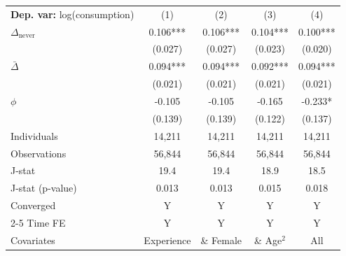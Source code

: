\begin{tabular}{l cccc} \toprule  \textbf{Dep. var:}  log(consumption) 
                    &\multicolumn{1}{c}{(1)}   &\multicolumn{1}{c}{(2)}   &\multicolumn{1}{c}{(3)}   &\multicolumn{1}{c}{(4)}   \\

\addlinespace
$\Delta_{\text{never}}$&       0.106***&       0.106***&       0.104***&       0.100***\\
                    &     (0.027)   &     (0.027)   &     (0.023)   &     (0.020)   \\

\addlinespace
$\bar{\Delta}$      &       0.094***&       0.094***&       0.092***&       0.094***\\
                    &     (0.021)   &     (0.021)   &     (0.021)   &     (0.021)   \\

\addlinespace
$\phi$              &      -0.105   &      -0.105   &      -0.165   &      -0.233*  \\
                    &     (0.139)   &     (0.139)   &     (0.122)   &     (0.137)   \\
\addlinespace
Individuals         &      14,211   &      14,211   &      14,211   &      14,211   \\
Observations        &      56,844   &      56,844   &      56,844   &      56,844   \\
J-stat              &        19.4   &        19.4   &        18.9   &        18.5   \\
J-stat (p-value)    &       0.013   &       0.013   &       0.015   &       0.018   \\
Converged           &           Y   &           Y   &           Y   &           Y   \\
\cmidrule{2-5} Time FE & Y & Y & Y & Y \\ Covariates & Experience & \& Female & \& Age$^2$ & All \\ \bottomrule \end{tabular}
